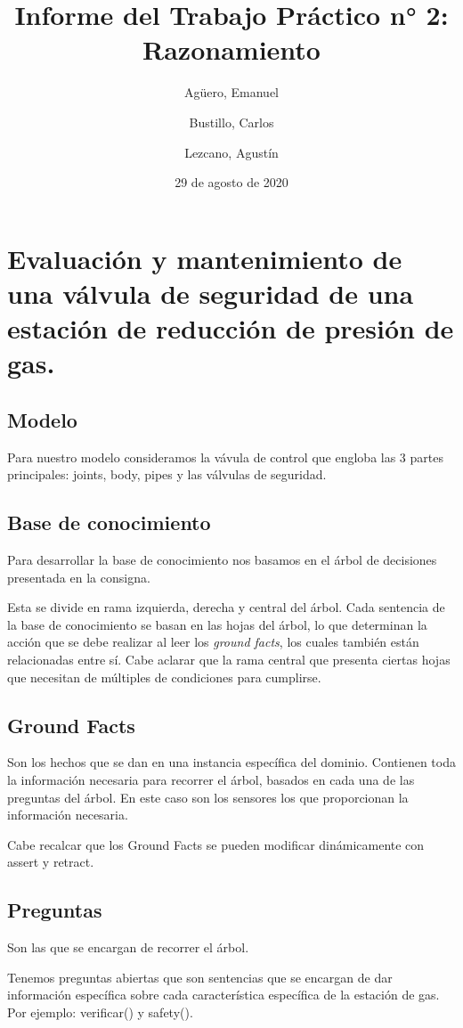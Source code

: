 \documentclass{article}
\title{Informe del Trabajo Práctico n° 2: Razonamiento}
\author{Agüero, Emanuel\\
\and
Bustillo, Carlos\\
\and
Lezcano, Agustín\\
}
\date{29 de agosto de 2020}
\begin{document}
\maketitle

\section{Evaluación y mantenimiento de una válvula de seguridad de una estación de reducción de presión de gas.}

\subsection{Modelo}
    Para nuestro modelo consideramos la vávula de control que engloba las 3 partes principales: joints, body, pipes y las válvulas de seguridad.

\subsection{Base de conocimiento}
    Para desarrollar la base de conocimiento nos basamos en el árbol de decisiones presentada en la consigna.
    
    Esta se divide en rama izquierda, derecha y central del árbol. Cada sentencia de la base de conocimiento se basan en las hojas del árbol, lo que determinan la acción que se debe realizar al leer los \textit{ground facts}, los cuales también están relacionadas entre sí. Cabe aclarar que la rama central que presenta ciertas hojas que necesitan de múltiples de condiciones para cumplirse. 

\subsection{Ground Facts}
    Son los hechos que se dan en una instancia específica del dominio. Contienen toda la información necesaria para recorrer el árbol, basados en cada una de las preguntas del árbol. En este caso son los sensores los que proporcionan la información necesaria. 
    
    Cabe recalcar que los Ground Facts se pueden modificar dinámicamente con assert y retract.

\subsection{Preguntas}
    Son las que se encargan de recorrer el árbol. 
    
    Tenemos preguntas abiertas que son sentencias que se encargan de dar información específica sobre cada característica específica de la estación de gas. Por ejemplo: verificar() y safety().
    
\end{document}
